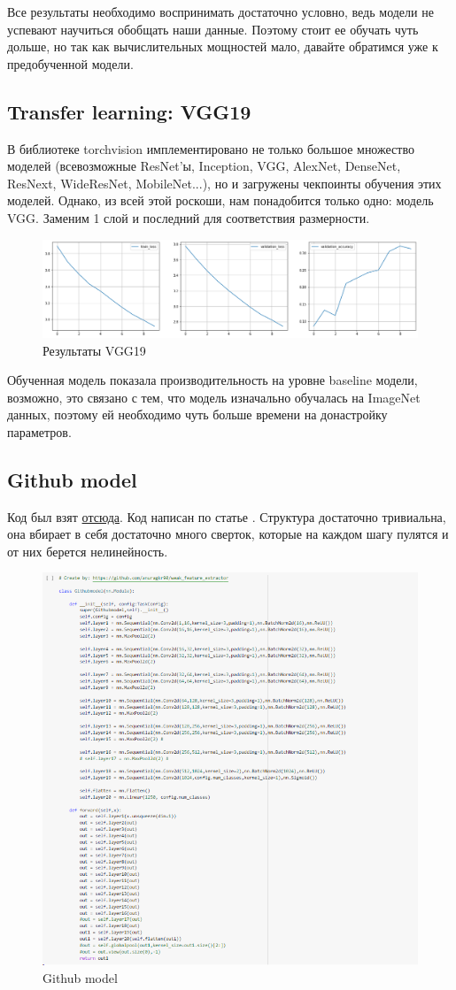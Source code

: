 \documentclass[a4paper,12pt]{article}
\begin{document}
 	Все результаты необходимо воспринимать достаточно условно, ведь модели не успевают научиться обобщать наши данные. Поэтому стоит ее обучать чуть дольше, но так как вычислительных мощностей мало, давайте обратимся уже к предобученной модели.
	 	
 	\subsection{Transfer learning: VGG19}
 	В библиотеке torchvision имплементировано не только большое множество моделей (всевозможные ResNet'ы, Inception, VGG, AlexNet, DenseNet, ResNext, WideResNet, MobileNet...), но и загружены чекпоинты обучения этих моделей. Однако, из всей этой роскоши, нам понадобится только одно: модель VGG. Заменим 1 слой и последний для соответствия размерности.
 		\begin{figure}[H]
 		\centering
 		\includegraphics[width=1\linewidth]{Image/Transfer_learning_results.png}
 		\caption{Результаты VGG19}
 		\label{fig:crnn}
 	\end{figure}
 	Обученная модель показала производительность на уровне baseline модели, возможно, это связано с тем, что модель изначально обучалась на ImageNet данных, поэтому ей необходимо чуть больше времени на донастройку параметров.
 	\subsection{Github model}
 	Код был взят  \href{https://github.com/anuragkr90/weak_feature_extractor}{отсюда}. Код написан по статье \cite{5}. Структура достаточно тривиальна, она вбирает в себя достаточно много сверток, которые на каждом шагу пулятся и от них берется нелинейность. 
 	\begin{figure}[H]
 		\centering
 		\includegraphics[width=0.7\linewidth]{Image/Github_model}
 		\caption{Github model}
 		\label{fig:githubmodel}
 	\end{figure}
 
\end{document}
